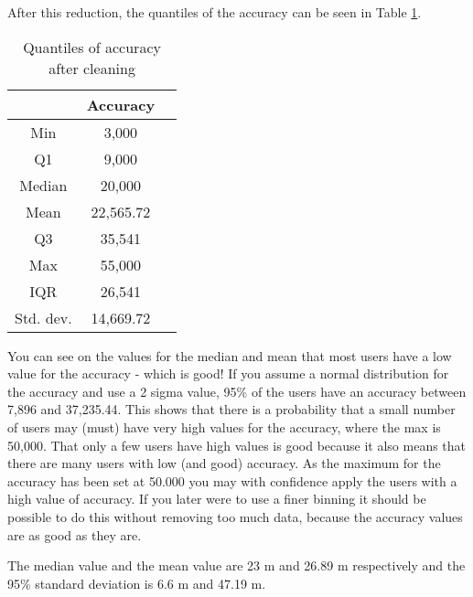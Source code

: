 After this reduction, the quantiles of the accuracy can be seen in Table \ref{tab:acc_quantiles}. 
 \begin{table}[htbp]
        \centering
        \small
        \setlength\tabcolsep{2pt}
        \begin{tabular}{|c|c|c|}
            \hline
                         & Accuracy      \\[0pt]
            \hline
                 Min     &  3,000       \\
            \hline
                 Q1      &  9,000   \\
            \hline
                 Median  &  20,000    \\
            \hline
                 Mean    &  22,565.72    \\
            \hline
                 Q3      &  35,541      \\
            \hline
                 Max &  55,000   \\
            \hline
                 IQR     &   26,541     \\
            \hline
                Std. dev.  &  14,669.72   \\
            \hline
        \end{tabular}
        \caption{Quantiles of accuracy after cleaning} %
        \label{tab:acc_quantiles}
\end{table}

You can see on the values for the median and mean that most users have a low value for the accuracy - which is good! If you assume a normal distribution for the accuracy and use a 2 sigma value, 95\% of the users have an accuracy between 7,896 and 37,235.44. This shows that there is a probability that a small number of users may (must) have very high values for the accuracy, where the max is 50,000. That only a few users have high values is good because it also means that there are many users with low (and good) accuracy. As the maximum for the accuracy has been set at 50.000 you may with confidence apply the users with a high value of accuracy. If you later were to use a finer binning it should be possible to do this without removing too much data, because the accuracy values are as good as they are.   

The median value and the mean value are 23 m and 26.89 m respectively and the 95\% standard deviation is 6.6 m and 47.19 m. 


